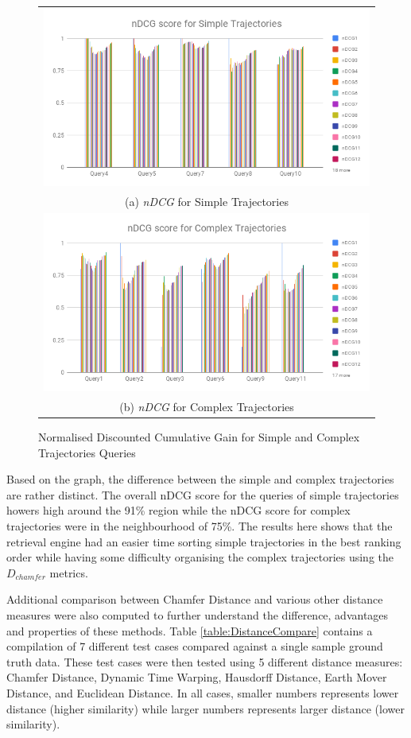 \begin{figure}[htb!]
  \centering
  \begin{tabular}{c}
   \includegraphics[width=0.9\linewidth]{image/retrievalTwo/ndcgSimple.png}\\
   (a) \textit{nDCG} for Simple Trajectories \\
   \includegraphics[width=0.9\linewidth]{image/retrievalTwo/ndcgComplex.png} \\
   (b) \textit{nDCG} for Complex Trajectories
  \end{tabular}
  \caption{Normalised Discounted Cumulative Gain for Simple and Complex
  Trajectories Queries}
  \label{fig:versionTwoNDCG}
\end{figure}

Based on the graph, the difference between the simple and complex trajectories
are rather distinct. The overall nDCG score for the queries of simple
trajectories howers high around the 91\% region while the nDCG score for complex
trajectories were in the neighbourhood of 75\%. The results here shows that the
retrieval engine had an easier time sorting simple trajectories in the best
ranking order while having some difficulty organising the complex trajectories
using the $D_{chamfer}$ metrics.

Additional comparison between Chamfer Distance and various other distance
measures were also computed to further understand the difference, advantages
and properties of these methods. Table \ref{table:DistanceCompare} contains a
compilation of 7 different test cases compared against a single sample ground
truth data. These test cases were then tested using 5 different distance
measures: Chamfer Distance, Dynamic Time Warping, Hausdorff Distance, Earth
Mover Distance, and Euclidean Distance. In all cases, smaller numbers
represents lower distance (higher similarity) while larger numbers represents
larger distance (lower similarity).

